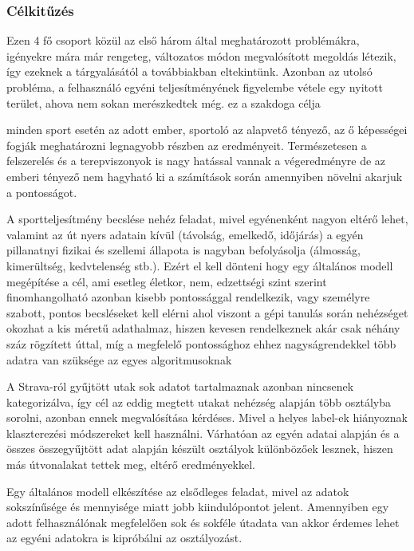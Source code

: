 \subsubsection{Célkitűzés}
Ezen 4 fő csoport közül az első három által meghatározott problémákra, igényekre mára már rengeteg, változatos módon megvalósított megoldás létezik, így ezeknek a tárgyalásától a továbbiakban eltekintünk. Azonban az utolsó probléma, a felhasználó egyéni teljesítményének figyelembe vétele egy nyitott terület, ahova nem sokan merészkedtek még. \TODO ez a szakdoga célja  
 


 minden sport esetén az adott ember, sportoló az alapvető tényező, az ő képességei fogják meghatározni legnagyobb részben az eredményeit. Természetesen a felszerelés és a terepviszonyok is nagy hatással vannak a végeredményre de az emberi tényező nem hagyható ki a számítások során amennyiben növelni akarjuk a pontosságot.




A sportteljesítmény becslése nehéz feladat, mivel egyénenként nagyon eltérő lehet, valamint az út nyers adatain kívül (távolság, emelkedő, időjárás) a egyén pillanatnyi fizikai és szellemi állapota is nagyban befolyásolja (álmosság, kimerültség, kedvtelenség stb.). Ezért el kell dönteni hogy egy általános modell megépítése a cél, ami esetleg életkor, nem, edzettségi szint szerint finomhangolható azonban kisebb pontossággal rendelkezik, vagy személyre szabott, pontos becsléseket kell elérni ahol viszont a gépi tanulás során nehézséget okozhat a kis méretű adathalmaz, hiszen kevesen rendelkeznek akár csak néhány száz rögzített úttal, míg a megfelelő pontossághoz ehhez nagyságrendekkel több adatra van szüksége az egyes algoritmusoknak




A Strava-ról gyűjtött utak sok adatot tartalmaznak azonban nincsenek kategorizálva, így cél az eddig megtett utakat nehézség alapján több osztályba sorolni, azonban ennek megvalósítása kérdéses. Mivel a helyes label-ek hiányoznak klaszterezési módszereket kell használni. Várhatóan az egyén adatai alapján és a összes összegyűjtött adat alapján készült osztályok különbözőek lesznek, hiszen más útvonalakat tettek meg, eltérő eredményekkel.

Egy általános modell elkészítése az elsődleges feladat, mivel az adatok sokszínűsége és mennyisége miatt jobb kiindulópontot jelent. Amennyiben egy adott felhasználónak megfelelően sok és sokféle útadata van akkor érdemes lehet az egyéni adatokra is kipróbálni az osztályozást.

